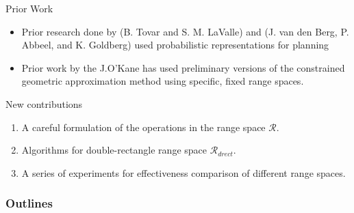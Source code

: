 \begin{frame}{Prior Work}
\begin{itemize}
\item Prior research done by (B. Tovar and S. M. LaValle) and (J. van den Berg,
  P. Abbeel, and K. Goldberg)
  used probabilistic representations for planning\\

\item Prior work by the J.O'Kane has used preliminary versions of the
  constrained geometric approximation method using specific, fixed range spaces.
\end{itemize}
New contributions
\begin{enumerate}
\item A careful formulation of the operations in the range space $\mathcal{R}$.
\item Algorithms for double-rectangle range space $\mathcal{R}_{drect}$.
\item A series of experiments for effectiveness comparison of different range spaces.
\end{enumerate}
\end{frame}
\begin{frame}
  \frametitle{Outlines}
  \tableofcontents[]
\end{frame}
